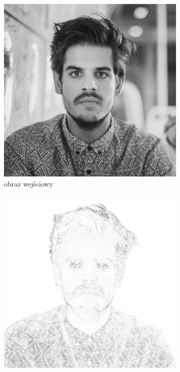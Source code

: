    \begin{figure}[H] 
    \centering
    \begin{subfigure}{0.32\textwidth}
        \centering
        \includegraphics[width = \textwidth]{img/4-mine/taco-mask/taco-grey.png}
        \caption{obraz wejściowy}
        \label{mine-param-taco-a}
    \end{subfigure}
    \begin{subfigure}{0.32\textwidth}
        \centering
        \includegraphics[width = \textwidth]{img/4-mine/taco-mask/taco_mask_c20_inv0_bg1_obj1_ed1.png}

\end{subfigure}
\end{figure}
